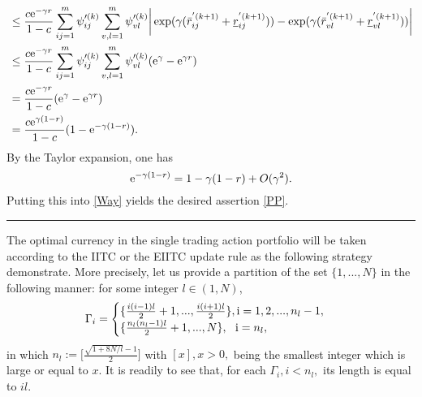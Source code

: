 \documentclass[11pt]{article}
\newcommand{\fin}{\hspace*{\fill}\rule{0.3em}{1ex}}
\newenvironment{proof}{{\bf \noindent Proof.}}{\fin}
\numberwithin{equation}{section}
\begin{document}
\begin{proof}
\begin{equation}
\begin{split}
&\le \frac{c\text{\rm{e}}^{-\gamma r}}{1-c}\sum_{ij=1}^{m}\psi'^{(k)}_{ij}\sum_{v,l=1}^{m}\psi'^{(k)}_{vl} \bigg| \exp(\gamma (\bar r_{ij}^{'(k+1)}+\underline r_{ij}^{'(k+1)}))-\exp(\gamma (\bar r_{vl}^{'(k+1)}+\underline r_{vl}^{'(k+1)}))\bigg|\\
&\le \frac{c\text{\rm{e}}^{-\gamma r}}{1-c}\sum_{ij=1}^{m}\psi'^{(k)}_{ij}\sum_{v,l=1}^{m}\psi'^{(k)}_{vl} (\text{\rm{e}}^\gamma-\text{\rm{e}}^{\gamma r})\\
&=\frac{c\text{\rm{e}}^{-\gamma r}}{1-c} (\text{\rm{e}}^\gamma-\text{\rm{e}}^{\gamma r})\\
&=\frac{c\text{\rm{e}}^{\gamma (1-r)}}{1-c} (1-\text{\rm{e}}^{-\gamma(1-r)}).
\end{split}
\end{equation}
By the Taylor expansion, one has 
\begin{equation*}
\text{\rm{e}}^{-\gamma(1-r)}=1-\gamma(1-r)+O(\gamma^2).
\end{equation*}
Putting this into \eqref{Way} yields the desired assertion \eqref{PP}.
\end{proof}

The optimal currency  in the single trading action portfolio will be taken according to the IITC or the EIITC  update rule as the following strategy demonstrate.  More precisely, let us provide a partition of the set $\{1,...,N\}$ in the following manner:  for some integer $l\in(1,N)$, 
\begin{equation}
\Gamma_i=\begin{cases}
\{\frac{i(i-1)l}{2}+1,...,\frac{i(i+1)l}{2}\},\text i=1,2,...,n_l-1,\\
\{\frac{n_l(n_l-1)l}{2}+1,...,N\},\,\,\,\,\text  i=n_l,
\end{cases}
\end{equation}
in which $n_l:=\Big[\frac{\sqrt{1+8N/l}-1}{2}\Big]$ with $[x], x>0,$ being the smallest integer which is large or equal to $x$. It is readily to see that, for each $\Gamma_i, i<n_l,$  its  length  is equal to $il.$
 
\end{document}
